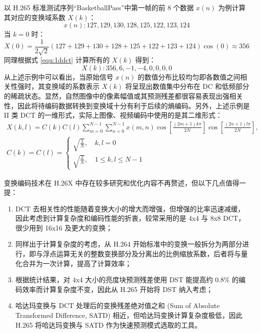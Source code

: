 以 H.265 标准测试序列“BasketballPass”中第一帧的前 8 个数据 $x(n)$ 为例计算其对应的变换域系数 $X(k)$：
\[
    x(n): 127,129,130,128,125,122,123,124
\]
当 $k=0$ 时：
\[
    X(0)=\frac{1}{2\sqrt{2}}(127+129+130+128+125+122+123+124)\cos(0)\approx 356
\]
同理根据式 \ref{equ:1ddct} 计算所有的 $X(k)$ 得到：
\[
    X(k): 356,6,-1,-4,0,0,0,0
\]
从上述示例中可以看出，当原始信号 $x(n)$ 的数值分布比较均匀即各数值之间相关性强时，其变换域的系数表示 $X(k)$ 将呈现出数值集中分布在 DC 和低频部分的稀疏状态。显然，自然图像中的像素幅值或其预测残差都很容易表现出强相关性，因此将待编码数据转换到变换域十分有利于后续的熵编码。另外，上述示例是 II 类 DCT 的一维形式，实际上图像、视频编码中使用的是其二维形式：
\begin{equation}
    \begin{gathered}
        X(k,l)=C(k)C(l)\sum_{m=0}^{N-1}\sum_{n=0}^{N-1}x(m,n)\cos\left[\frac{(2m+1)k\pi}{2N}\right]\cos\left[\frac{(2n+1)l\pi}{2N}\right], \\
        C(k)=C(l)= 
        \begin{cases}
            \sqrt{\frac{1}{N}}, \quad k,l=0 \\
            \sqrt{\frac{2}{N}}, \quad 1 \leqslant k,l \leqslant N-1
        \end{cases}
    \end{gathered}
    \label{equ:2ddct}
\end{equation}

变换编码技术在 H.26X 中存在较多研究和优化内容不再赘述，但以下几点值得一提：
\begin{enumerate}
    \item DCT 去相关性的性能随着变换大小的增大而增强，但增强的比率迅速减缓，因此考虑到计算复杂度和编码性能的折衷，较常采用的是 4x4 与 8x8 DCT，很少用到 16x16 及更大的变换；
    \item 同样出于计算复杂度的考虑，从 H.264 开始标准中的变换一般拆分为两部分进行，即与浮点运算无关的整数变换部分及分离出的比例缩放系数，后者将与量化合并为一次计算，提高了计算效率；
    \item 根据统计结果，对 4x4 大小的亮度块预测残差使用 DST 能提高约 0.8\% 的编码效率而计算复杂度不变，因此从 H.265 开始将 DST 纳入考虑；
    \item 哈达玛变换与 DCT 处理后的变换残差绝对值之和 (Sum of Absolute Transformed Difference, SATD) 相近，但哈达玛变换计算复杂度极低，因此 H.265 将哈达玛变换与 SATD 作为快速预测模式选取的工具。
\end{enumerate}

